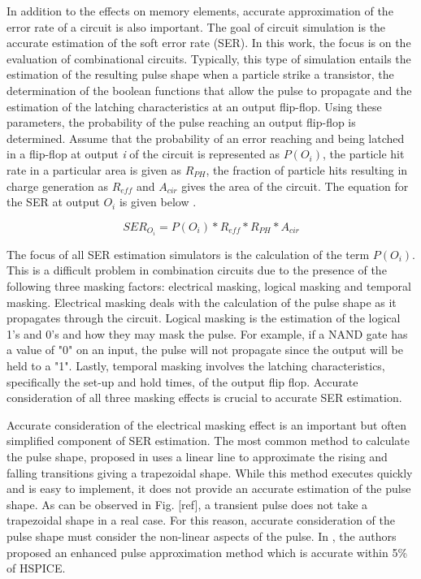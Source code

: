 In addition to the effects on memory elements, accurate approximation of the error rate of a circuit is also important. The goal of circuit simulation is the accurate estimation of the soft error rate (SER). In this work, the focus is on the evaluation of combinational circuits. Typically, this type of simulation entails the estimation of the resulting pulse shape when a particle strike a transistor, the determination of the boolean functions that allow the pulse to propagate and the estimation of the latching characteristics at an output flip-flop. Using these parameters, the probability of the pulse reaching an output flip-flop is determined. Assume that the probability of an error reaching and being latched in a flip-flop at output \textit{i} of the circuit is represented as \textit{$P(O_i)$}, the particle hit rate in a particular area is given as \textit{$R_{PH}$}, the fraction of particle hits resulting in charge generation as \textit{$R_{eff}$} and \textit{$A_{cir}$} gives the area of the circuit. The equation for the SER at output \textit{$O_i$} is given below \cite{METSys}.

\begin{equation}\label{SER_eq}
SER_{O_i} = P(O_i) * R_{eff} * R_{PH} * A_{cir}
\end{equation}

The focus of all SER estimation simulators is the calculation of the term \textit{$P(O_i)$}. This is a difficult problem in combination circuits due to the presence of the following three masking factors: electrical masking, logical masking and temporal masking. Electrical masking deals with the calculation of the pulse shape as it propagates through the circuit. Logical masking is the estimation of the logical 1's and 0's and how they may mask the pulse. For example, if a NAND gate has a value of "0" on an input, the pulse will not propagate since the output will be held to a "1". Lastly, temporal masking involves the latching characteristics, specifically the set-up and hold times, of the output flip flop. Accurate consideration of all three masking effects is crucial to accurate SER estimation.

Accurate consideration of the electrical masking effect is an important but often simplified component of SER estimation. The most common method to calculate the pulse shape, proposed in \cite{Omana_Trap} uses a linear line to approximate the rising and falling transitions giving a trapezoidal shape. While this method executes quickly and is easy to implement, it does not provide an accurate estimation of the pulse shape. As can be observed in Fig. [ref], a transient pulse does not take a trapezoidal shape in a real case. For this reason, accurate consideration of the pulse shape must consider the non-linear aspects of the pulse. In \cite{Accurate_Masking}, the authors proposed an enhanced pulse approximation method which is accurate within 5\% of HSPICE. 